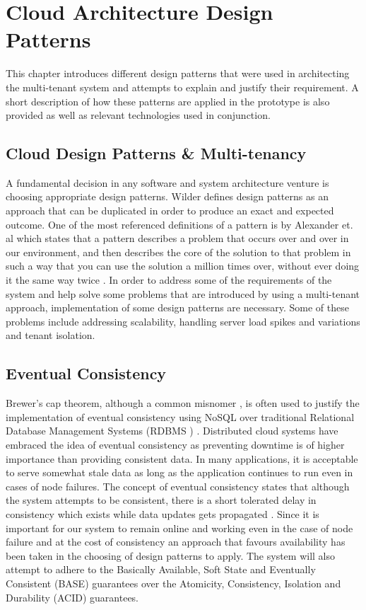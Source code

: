 \chapter{Cloud Architecture Design Patterns}

This chapter introduces different design patterns that were used in architecting the multi-tenant system and attempts to explain and justify their requirement. A short description of how these patterns are applied in the prototype is also provided as well as relevant technologies used in conjunction.

\section{Cloud Design Patterns \& Multi-tenancy}

A fundamental decision in any software and system architecture venture is choosing appropriate design patterns. Wilder \cite{Wilder2012-so} defines design patterns as an approach that can be duplicated in order to produce an exact and expected outcome. One of the most referenced definitions of a pattern is by Alexander et. al which states that a pattern describes a problem that occurs over and over in our environment, and then describes the core of the solution to that problem in such a way that you can use the solution a million times over, without ever doing it the same way twice \cite{Alexander1977-ni}. In order to address some of the requirements of the system and help solve some problems that are introduced by using a multi-tenant approach, implementation of some design patterns are necessary. Some of these problems include addressing scalability, handling server load spikes and variations and tenant isolation.

\section{Eventual Consistency}

Brewer's cap theorem, although a common misnomer \cite{Brewer2012}, is often used to justify the implementation of eventual consistency using NoSQL over traditional Relational Database Management Systems (RDBMS ) \cite{Wilder2012-so}. Distributed cloud systems have embraced the idea of eventual consistency as preventing downtime is of higher importance than providing consistent data. In many applications, it is acceptable to serve somewhat stale data as long as the application continues to run even in cases of node failures. The concept of eventual consistency states that although the system attempts to be consistent, there is a short tolerated delay in consistency which exists while data updates gets propagated \cite{Wilder2012-so}. Since it is important for our system to remain online and working even in the case of node failure and at the cost of consistency an approach that favours availability has been taken in the choosing of design patterns to apply. The system will also attempt to adhere to the Basically Available, Soft State and Eventually Consistent (BASE) guarantees over the Atomicity, Consistency, Isolation and Durability (ACID) guarantees.
 
